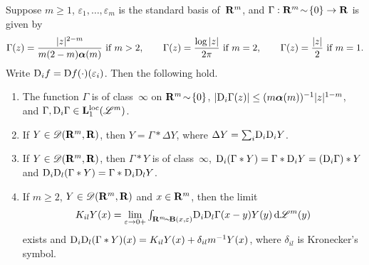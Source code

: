 \documentclass[a4paper,twoside,leqno]{article}
\begin{document}
\begin{lemma}
    \label{new:newton}
    Suppose $m \ge 1$, $\varepsilon_1, \ldots, \varepsilon_m$ is the standard basis
    of~$\mathbf{R}^m$, and $\Gamma : \mathbf{R}^m \!\sim\! \{0\} \to \mathbf{R}$ is given by
    \begin{displaymath}
        \Gamma(z) = \frac{|z|^{2-m}}{m (2 - m) \boldsymbol{\alpha}(m)} \ \text{if $m > 2$}, \qquad
        \Gamma(z) = \frac{\log |z|}{2 \pi} \ \text{if $m = 2$}, \qquad
        \Gamma(z) = \frac{|z|}{2} \ \text{if $m = 1$}.
    \end{displaymath}
    Write $\mathrm{D}_i f = \mathrm{D} f(\cdot)(\varepsilon_i)$. Then the following hold.
    \begin{enumerate}
        \item
        \label{i:new:newton:loc}
        The function $\Gamma$ is of class~$\infty$ on $\mathbf{R}^m \!\sim\! \{0\}$, $|\mathrm{D}_i \Gamma(z)| \le
        (m \boldsymbol{\alpha}(m))^{-1} |z|^{1-m}$, and $\Gamma, \mathrm{D}_i \Gamma \in \mathbf{L}_{1}^{\mathrm{loc}}(\mathscr{L}^m)$.
        \item
        \label{i:new:newton:rep}
        If $Y \in \mathscr{D}(\mathbf{R}^m,\mathbf{R})$, then $Y = \Gamma * \Delta Y$, where $\Delta Y = {\textstyle\sum_{i}^{}}
        \mathrm{D}_i \mathrm{D}_i Y$.
        \item
        \label{i:new:newton:der}
        If $Y \in \mathscr{D}(\mathbf{R}^m,\mathbf{R})$, then $\Gamma * Y$ is of class~$\infty$, $\mathrm{D}_i(\Gamma * Y) =
        \Gamma * \mathrm{D}_i Y = (\mathrm{D}_i \Gamma) * Y$ and $\mathrm{D}_i \mathrm{D}_l (\Gamma * Y) = \Gamma * \mathrm{D}_i \mathrm{D}_l Y$.
        \item
        \label{i:new:newton:pv}
        If $m \ge 2$, $Y \in \mathscr{D}(\mathbf{R}^m,\mathbf{R})$ and $x \in \mathbf{R}^m$, then the limit
        \begin{displaymath}
            K_{il} Y(x) = \lim_{\varepsilon \to 0+} {\textstyle\int_{\mathbf{R}^m \!\sim\! \mathbf{B}(x,\varepsilon)}^{}}
            \mathrm{D}_i \mathrm{D}_l \Gamma(x - y) Y(y) \,\mathrm{d} \mathscr{L}^m(y)
        \end{displaymath}
        exists and $\mathrm{D}_i \mathrm{D}_l (\Gamma * Y)(x) = K_{il} Y(x) + \delta_{il} m^{-1} Y(x)$, where
        $\delta_{il}$ is Kronecker's symbol.
    \end{enumerate}
\end{lemma}
\end{document}
